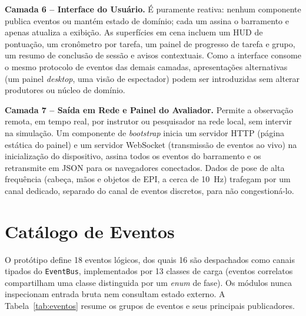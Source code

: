 \textbf{Camada 6 -- Interface do Usuário.} É puramente reativa: nenhum componente publica eventos ou mantém estado de domínio; cada um assina o barramento e apenas atualiza a exibição. As superfícies em cena incluem um HUD de pontuação, um cronômetro por tarefa, um painel de progresso de tarefa e grupo, um resumo de conclusão de sessão e avisos contextuais. Como a interface consome o mesmo protocolo de eventos das demais camadas, apresentações alternativas (um painel \textit{desktop}, uma visão de espectador) podem ser introduzidas sem alterar produtores ou núcleo de domínio.

\textbf{Camada 7 -- Saída em Rede e Painel do Avaliador.} Permite a observação remota, em tempo real, por instrutor ou pesquisador na rede local, sem intervir na simulação. Um componente de \textit{bootstrap} inicia um servidor HTTP (página estática do painel) e um servidor WebSocket (transmissão de eventos ao vivo) na inicialização do dispositivo, assina todos os eventos do barramento e os retransmite em \gls{JSON} para os navegadores conectados. Dados de pose de alta frequência (cabeça, mãos e objetos de EPI, a cerca de 10~Hz) trafegam por um canal dedicado, separado do canal de eventos discretos, para não congestioná-lo.

\section{Catálogo de Eventos}

O protótipo define 18 eventos lógicos, dos quais 16 são despachados como canais tipados do \texttt{EventBus}, implementados por 13 classes de carga (eventos correlatos compartilham uma classe distinguida por um \textit{enum} de fase). Os módulos nunca inspecionam entrada bruta nem consultam estado externo. A Tabela~\ref{tab:eventos} resume os grupos de eventos e seus principais publicadores.

